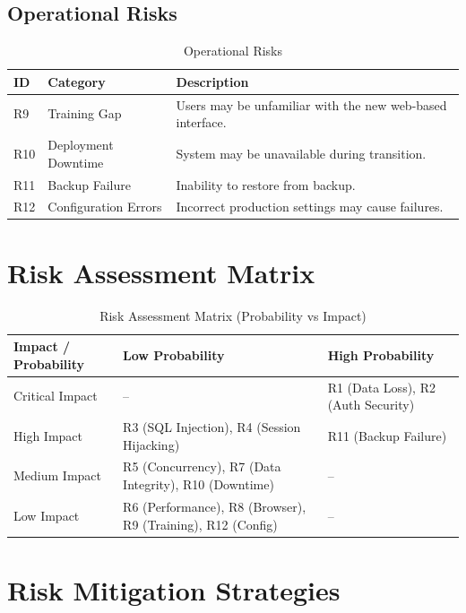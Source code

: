 \subsection{Operational Risks}

\begin{table}[h]
  \centering
  \caption{Operational Risks}
  \begin{tabular}{p{0.9cm} p{3cm} p{8cm}}
    \toprule
    \textbf{ID} & \textbf{Category} & \textbf{Description} \\
    \midrule
    R9  & Training Gap & Users may be unfamiliar with the new web-based interface. \\
    R10 & Deployment Downtime & System may be unavailable during transition. \\
    R11 & Backup Failure & Inability to restore from backup. \\
    R12 & Configuration Errors & Incorrect production settings may cause failures. \\
    \bottomrule
  \end{tabular}
\end{table}

\section{Risk Assessment Matrix}

\begin{table}[h]
  \centering
  \caption{Risk Assessment Matrix (Probability vs Impact)}
  \begin{tabular}{p{3cm} p{5cm} p{5cm}}
    \toprule
    \textbf{Impact / Probability} & \textbf{Low Probability} & \textbf{High Probability} \\
    \midrule
    Critical Impact & -- & R1 (Data Loss), R2 (Auth Security) \\
    High Impact     & R3 (SQL Injection), R4 (Session Hijacking) & R11 (Backup Failure) \\
    Medium Impact   & R5 (Concurrency), R7 (Data Integrity), R10 (Downtime) & -- \\
    Low Impact      & R6 (Performance), R8 (Browser), R9 (Training), R12 (Config) & -- \\
    \bottomrule
  \end{tabular}
\end{table}

\section{Risk Mitigation Strategies}

